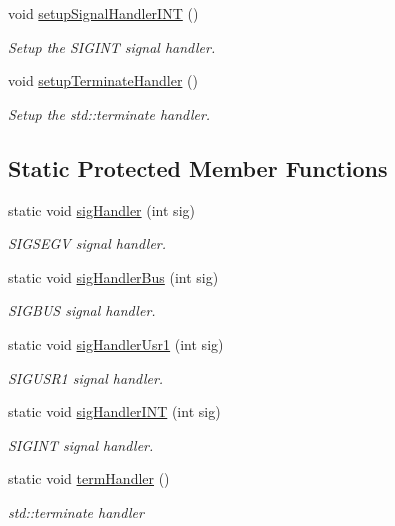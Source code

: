 \begin{DoxyCompactItemize}
void \hyperlink{structvt_1_1runtime_1_1_runtime_a382e68597ae7acb16bdb9f1c3ab4f010}{setup\+Signal\+Handler\+I\+NT} ()
\begin{DoxyCompactList}\small\item\em Setup the S\+I\+G\+I\+NT signal handler. \end{DoxyCompactList}\item 
void \hyperlink{structvt_1_1runtime_1_1_runtime_ad66c903b37209c7499ebdf53efb5f9b3}{setup\+Terminate\+Handler} ()
\begin{DoxyCompactList}\small\item\em Setup the std\+::terminate handler. \end{DoxyCompactList}\end{DoxyCompactItemize}
\subsection*{Static Protected Member Functions}
\begin{DoxyCompactItemize}
\item 
static void \hyperlink{structvt_1_1runtime_1_1_runtime_a15fd3d8eb4952deca7488ff4fa07258c}{sig\+Handler} (int sig)
\begin{DoxyCompactList}\small\item\em S\+I\+G\+S\+E\+GV signal handler. \end{DoxyCompactList}\item 
static void \hyperlink{structvt_1_1runtime_1_1_runtime_aa94c1638280b8f5e9acac0fb44f85a6f}{sig\+Handler\+Bus} (int sig)
\begin{DoxyCompactList}\small\item\em S\+I\+G\+B\+US signal handler. \end{DoxyCompactList}\item 
static void \hyperlink{structvt_1_1runtime_1_1_runtime_a833f09083e671080fb8ae1a44bc50321}{sig\+Handler\+Usr1} (int sig)
\begin{DoxyCompactList}\small\item\em S\+I\+G\+U\+S\+R1 signal handler. \end{DoxyCompactList}\item 
static void \hyperlink{structvt_1_1runtime_1_1_runtime_a3ce54aa1371a6448670e06049a0985c4}{sig\+Handler\+I\+NT} (int sig)
\begin{DoxyCompactList}\small\item\em S\+I\+G\+I\+NT signal handler. \end{DoxyCompactList}\item 
static void \hyperlink{structvt_1_1runtime_1_1_runtime_abe295b9ea216fafe2b494e2bc609f8fb}{term\+Handler} ()
\begin{DoxyCompactList}\small\item\em std\+::terminate handler \end{DoxyCompactList}\end{DoxyCompactItemize}
